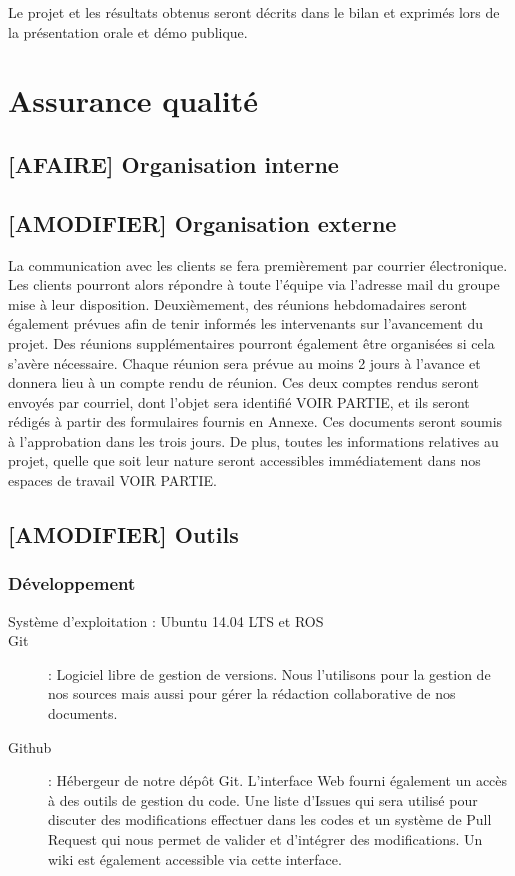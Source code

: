 \documentclass[10pt,a4paper]{article}
\begin{document}
Le projet et les résultats obtenus seront décrits dans le bilan et exprimés lors de la présentation orale et démo publique. 


\section{Assurance qualité}

\subsection{[AFAIRE] Organisation interne}

\subsection{[AMODIFIER] Organisation externe}

La communication avec les clients se fera premièrement par courrier électronique. Les clients pourront alors répondre à toute l’équipe via l’adresse mail du groupe mise à leur disposition. Deuxièmement, des réunions hebdomadaires seront également prévues afin de tenir informés les intervenants sur l’avancement du projet. Des réunions supplémentaires pourront également être organisées si cela s’avère nécessaire. Chaque réunion sera prévue au moins 2 jours à l’avance et donnera lieu à un compte rendu de réunion. Ces deux comptes rendus seront envoyés par courriel, dont l’objet sera identifié VOIR PARTIE, et ils seront rédigés à partir des formulaires fournis en Annexe. Ces documents seront soumis à l’approbation dans les trois jours. De plus, toutes les informations relatives au projet, quelle que soit leur nature seront accessibles immédiatement dans nos espaces de travail VOIR PARTIE.

\subsection{[AMODIFIER] Outils}

\subsubsection{Développement}
\begin{description}
\item [Système d'exploitation : Ubuntu 14.04 LTS et ROS]
\item [Git] : Logiciel libre de gestion de versions. Nous l'utilisons pour la gestion de nos sources mais aussi pour gérer la rédaction collaborative de nos documents.
\item [Github] : Hébergeur de notre dépôt Git. L'interface Web fourni également un accès à des outils de gestion du code. Une liste d'Issues qui sera utilisé pour discuter des modifications effectuer dans les codes et un système de Pull Request qui nous permet de valider et d'intégrer des modifications. Un wiki est également accessible via cette interface.
\end{description}
\end{document}
